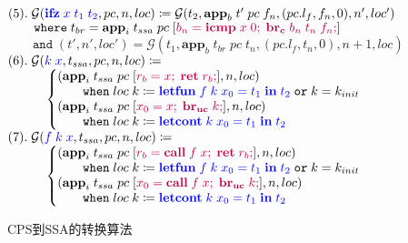 \begin{figure}[!ht]
\begin{algorithm}[H]
        $ (5).\; \mathbf{\mathcal{G}}(\textcolor{blue}{\mathbf{ifz}\; x\; t_1\; t_2}, pc, n, loc) \coloneqq \mathbf{\mathcal{G}}(t_2, \mathbf{app}_b\; t'\; pc\; f_n, (pc.l_f, f_n, 0), n', loc') $ \\
        $ \quad\quad \mathtt{where}\; t_{br} = \mathbf{app}_i\; t_{ssa}\; pc\; [\textcolor{purple}{b_n=\mathbf{icmp}\; x\; 0;\; \mathbf{br_c}\; b_n\; t_n\; f_n;}]  $ \\
        $ \quad\quad \mathtt{and}\; (t', n', loc') = \mathbf{\mathcal{G}}(t_1, \mathbf{app}_b\; t_{br}\; pc\; t_n, (pc.l_f, t_n, 0), n+1, loc) $ \\
        $ (6).\; \mathbf{\mathcal{G}}(\textcolor{blue}{k\; x}, t_{ssa}, pc, n, loc) \coloneqq $\\
        $\quad\quad\quad \left\{ 
        \begin{aligned}
            & (\mathbf{app}_i\; t_{ssa}\; pc\; [\textcolor{purple}{r_b = x;\; \mathbf{ret}\; r_b;}], n, loc) \\[-3pt]
            & \quad\quad \mathtt{when}\; loc\; k \coloneqq \textcolor{blue}{\mathbf{letfun}\; f\; k\; x_0=t_1\; \mathbf{in}\; t_2}\; \mathtt{or}\; k=k_{init} \\[-3pt]
            & (\mathbf{app}_i\; t_{ssa}\; pc\; [\textcolor{purple}{x_0 = x;\; \mathbf{br_{uc}}\; k;}], n, loc) \\[-3pt]
            & \quad\quad \mathtt{when}\; loc\; k \coloneqq \textcolor{blue}{\mathbf{letcont}\; k\; x_0=t_1\; \mathbf{in}\; t_2} \\
        \end{aligned}
        \right. $\\
        $ (7).\; \mathbf{\mathcal{G}}(\textcolor{blue}{f\; k\; x}, t_{ssa}, pc, n, loc) \coloneqq $ \\
        $\quad\quad\quad  \left\{ 
            \begin{aligned}
        & (\mathbf{app}_i\; t_{ssa}\; pc\; [\textcolor{purple}{r_b = \mathbf{call}\; f\; x;\; \mathbf{ret}\; r_b;}], n, loc) \\[-3pt]
        & \quad\quad \mathtt{when}\; loc\; k \coloneqq \textcolor{blue}{\mathbf{letfun}\; f\; k\; x_0=t_1\; \mathbf{in}\; t_2}\; \mathtt{or}\; k=k_{init} \\[-3pt]
        & (\mathbf{app}_i\; t_{ssa}\; pc\; [\textcolor{purple}{x_0 = \mathbf{call}\; f\; x;\; \mathbf{br_{uc}}\; k;}], n, loc) \\[-3pt]      
        & \quad\quad \mathtt{when}\; loc\; k \coloneqq \textcolor{blue}{\mathbf{letcont}\; k\; x_0=t_1\; \mathbf{in}\; t_2} \\
            \end{aligned}
        \right. $\\
    \end{algorithm}
    \caption{CPS到SSA的转换算法}\label{cps2ssa}
\end{figure}


